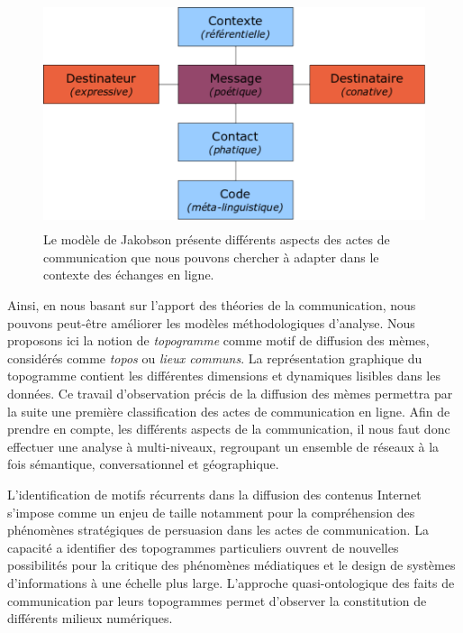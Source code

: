 \begin{figure}[htpb]
    \centering

    \includegraphics[width=4.6894in,height=2.6114in]{figures/chap3/chapitre3-img5.png}

    \caption[Modèle de Jakobson]{ Le modèle de Jakobson présente différents aspects des actes de communication que nous pouvons chercher à adapter dans le contexte des échanges en ligne.}
    \label{fig:jakobson}

\end{figure}

Ainsi, en nous basant sur l'apport des théories de la communication, nous pouvons peut-\^etre améliorer les modèles méthodologiques d{\textquoteright}analyse. Nous proposons ici la notion de \textit{topogramme} comme motif de diffusion des mèmes, considérés comme \textit{topos} ou \textit{lieux communs}. La représentation graphique du topogramme contient les différentes dimensions et dynamiques lisibles dans les données. Ce travail d'observation précis de la diffusion des mèmes permettra par la suite une première classification des actes de communication en ligne. Afin de prendre en compte, les différents aspects de la communication, il nous faut donc effectuer une analyse à multi-niveaux, regroupant un ensemble de réseaux à la fois sémantique, conversationnel et géographique.

L’identification de motifs récurrents dans la diffusion des contenus Internet s'impose comme un enjeu de taille notamment pour la compréhension des phénomènes stratégiques de persuasion dans les actes de communication. La capacité a identifier des topogrammes particuliers ouvrent de nouvelles possibilités pour la critique des phénomènes médiatiques et le design de systèmes d’informations à une échelle plus large. L'approche quasi-ontologique des faits de communication par leurs topogrammes  permet d'observer la constitution de différents milieux numériques.